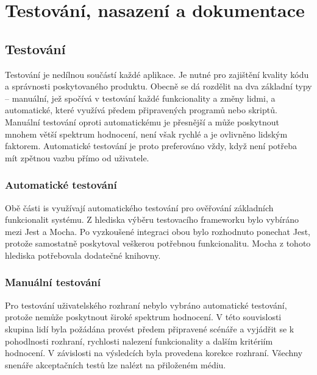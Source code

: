 \chapter{Testování, nasazení a dokumentace}




\section{Testování}

Testování je nedílnou součástí každé aplikace. Je nutné pro zajištění kvality kódu a správnosti poskytovaného produktu. Obecně se dá rozdělit na dva základní typy -- manuální, jež spočívá v testování každé funkcionality a změny lidmi, a automatické, které využívá předem připravených programů nebo skriptů. Manuální testování oproti automatickému je přesnější a může poskytnout mnohem větší spektrum hodnocení, není však rychlé a je ovlivněno lidským faktorem. Automatické testování je proto preferováno vždy, když není potřeba mít zpětnou vazbu přímo od uživatele.


\subsection{Automatické testování}

Obě části \gls{is} využívají automatického testování pro ověřování základních funkcionalit systému. Z hlediska výběru testovacího frameworku bylo vybíráno mezi Jest a Mocha. Po vyzkoušené integraci obou bylo rozhodnuto ponechat Jest, protože samostatně poskytoval veškerou potřebnou funkcionalitu. Mocha z tohoto hlediska potřebovala dodatečné knihovny.


\subsection{Manuální testování}

Pro testování uživatelského rozhraní nebylo vybráno automatické testování, protože nemůže poskytnout široké spektrum hodnocení. V této souvislosti skupina lidí byla požádána provést předem připravené scénáře a vyjádřit se k pohodlnosti rozhraní, rychlosti nalezení funkcionality a dalším kritériím hodnocení. V závislosti na výsledcích byla provedena korekce rozhraní. Všechny snenáře akceptačních testů lze nalézt na přiloženém médiu.


